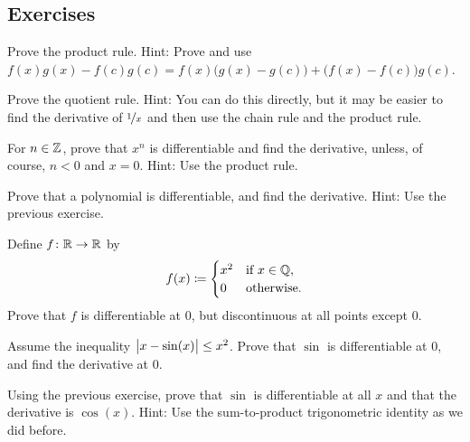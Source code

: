 \subsection{Exercises}

\begin{exercise}
Prove the product rule.
Hint: Prove and use
$f(x) g(x) - f(c) g(c) = f(x)\bigl( g(x) - g(c) \bigr) + \bigl( f(x) -
f(c) \bigr) g(c)$.
\end{exercise}

\begin{exercise}
Prove the quotient rule.  Hint: You can do this directly, but it may be
easier to find the derivative of $\nicefrac{1}{x}$ and then use
the chain rule and the product rule.
\end{exercise}

\begin{exercise} \label{exercise:diffofxn}
For $n \in {\mathbb{Z}}$,
prove that $x^n$ is differentiable and find the derivative,
unless, of course, $n < 0$ and $x=0$.
Hint: Use the product rule.
\end{exercise}

\begin{exercise}
Prove that a polynomial is differentiable, and find the derivative.
Hint: Use the previous exercise.
\end{exercise}

\begin{exercise}
Define $f \colon {\mathbb{R}} \to {\mathbb{R}}$ by
\begin{equation*}
f(x) \coloneqq
\begin{cases}
x^2 & \text{if } x \in {\mathbb{Q}},\\
0 & \text{otherwise.}
\end{cases}
\end{equation*}
Prove that $f$ is differentiable at $0$, but discontinuous at all points
except $0$.
\end{exercise}

\begin{exercise}
Assume the inequality $\bigl\lvert {x-\sin(x)} \bigr\rvert \leq x^2$.  Prove that $\sin$ is
differentiable at $0$, and find the derivative at $0$.
\end{exercise}

\begin{exercise}
Using the previous exercise, prove that $\sin$ is differentiable at all $x$
and that the derivative is $\cos(x)$.  Hint: Use the sum-to-product
trigonometric identity as we did before.
\end{exercise}

